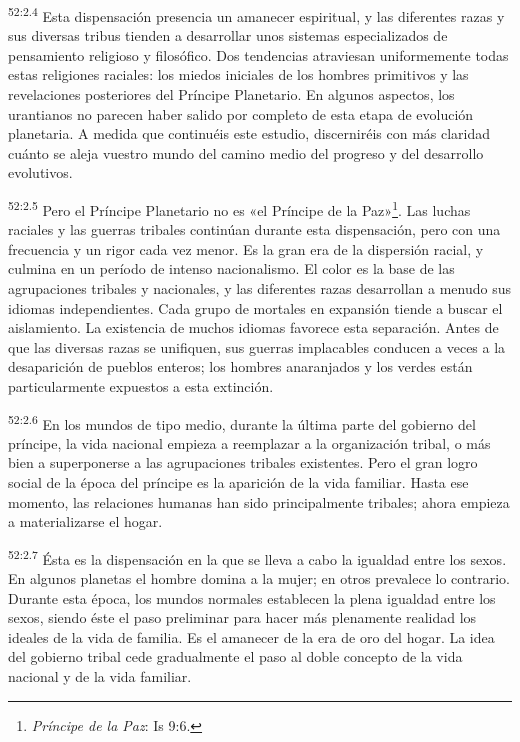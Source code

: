 \par
\textsuperscript{52:2.4} Esta dispensación presencia un amanecer espiritual, y las diferentes razas y sus diversas tribus tienden a desarrollar unos sistemas especializados de pensamiento religioso y filosófico. Dos tendencias atraviesan uniformemente todas estas religiones raciales: los miedos iniciales de los hombres primitivos y las revelaciones posteriores del Príncipe Planetario. En algunos aspectos, los urantianos no parecen haber salido por completo de esta etapa de evolución planetaria. A medida que continuéis este estudio, discerniréis con más claridad cuánto se aleja vuestro mundo del camino medio del progreso y del desarrollo evolutivos.

\par
\textsuperscript{52:2.5} Pero el Príncipe Planetario no es «el Príncipe de la Paz»\footnote{\textit{Príncipe de la Paz}: Is 9:6.}. Las luchas raciales y las guerras tribales continúan durante esta dispensación, pero con una frecuencia y un rigor cada vez menor. Es la gran era de la dispersión racial, y culmina en un período de intenso nacionalismo. El color es la base de las agrupaciones tribales y nacionales, y las diferentes razas desarrollan a menudo sus idiomas independientes. Cada grupo de mortales en expansión tiende a buscar el aislamiento. La existencia de muchos idiomas favorece esta separación. Antes de que las diversas razas se unifiquen, sus guerras implacables conducen a veces a la desaparición de pueblos enteros; los hombres anaranjados y los verdes están particularmente expuestos a esta extinción.

\par
\textsuperscript{52:2.6} En los mundos de tipo medio, durante la última parte del gobierno del príncipe, la vida nacional empieza a reemplazar a la organización tribal, o más bien a superponerse a las agrupaciones tribales existentes. Pero el gran logro social de la época del príncipe es la aparición de la vida familiar. Hasta ese momento, las relaciones humanas han sido principalmente tribales; ahora empieza a materializarse el hogar.

\par
\textsuperscript{52:2.7} Ésta es la dispensación en la que se lleva a cabo la igualdad entre los sexos. En algunos planetas el hombre domina a la mujer; en otros prevalece lo contrario. Durante esta época, los mundos normales establecen la plena igualdad entre los sexos, siendo éste el paso preliminar para hacer más plenamente realidad los ideales de la vida de familia. Es el amanecer de la era de oro del hogar. La idea del gobierno tribal cede gradualmente el paso al doble concepto de la vida nacional y de la vida familiar.

